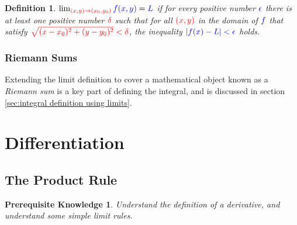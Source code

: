 \documentclass{myarticle}
\newcommand{\hor}[1]{\textcolor{red}{#1}}
\newcommand{\ver}[1]{\textcolor{blue}{#1}}
\theoremstyle{nospace}
\newtheorem*{oldprereq}{Prerequisite Knowledge}
\newenvironment{prereq}
{\begin{mdframed}\begin{oldprereq}}
    {\end{oldprereq}\end{mdframed}}
\newtheorem*{oldattempt}{Definition}
\newenvironment{attempt}
{\begin{mdframed}\begin{oldattempt}}
    {\end{oldattempt}\end{mdframed}}
\newtheorem{old series theorem}{Theorem}
\newenvironment{series theorem}
{\begin{mdframed}\begin{old series theorem}}
    {\end{old series theorem}\end{mdframed}}
\begin{document}
\begin{attempt}
  $\lim_{\hor{(x, y) \to (x_0, y_0)}} \ver{f(x, y)} = \ver{L}$ if for
  every positive number $\ver{\epsilon}$ there is at least one
  positive number $\hor{\delta}$ such that for all $\hor{(x, y)}$ in
  the domain of $\ver{f}$ that satisfy
  $\hor{\sqrt{(x - x_0)^2 + (y - y_0)^2} < \delta}$, the inequality
  $\ver{|f(x) - L| < \epsilon}$ holds.
\end{attempt}

\subsubsection{Riemann Sums}
\label{sec:limits of riemann sums}

Extending the limit definition to cover a mathematical object known as
a \emph{Riemann sum} is a key part of defining the integral, and is
discussed in section \ref{sec:integral definition using limits}.

\section{Differentiation}
\label{sec:differentiation}

\subsection{The Product Rule}
\label{sec:product rule}

\begin{prereq}
  Understand the definition of a derivative, and understand some
  simple limit rules.
\end{prereq}
\end{document}
